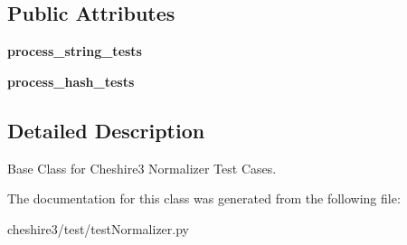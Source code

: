 \subsection*{Public Attributes}
\begin{DoxyCompactItemize}
\item 
\hypertarget{classcheshire3_1_1test_1_1test_normalizer_1_1_normalizer_test_case_a9326f944ed7fbf3181d10ad4c1018790}{{\bfseries process\-\_\-string\-\_\-tests}}\label{classcheshire3_1_1test_1_1test_normalizer_1_1_normalizer_test_case_a9326f944ed7fbf3181d10ad4c1018790}

\item 
\hypertarget{classcheshire3_1_1test_1_1test_normalizer_1_1_normalizer_test_case_afa13483bfef04491b99af55f94afad50}{{\bfseries process\-\_\-hash\-\_\-tests}}\label{classcheshire3_1_1test_1_1test_normalizer_1_1_normalizer_test_case_afa13483bfef04491b99af55f94afad50}

\end{DoxyCompactItemize}


\subsection{Detailed Description}
\begin{DoxyVerb}Base Class for Cheshire3 Normalizer Test Cases.\end{DoxyVerb}
 

The documentation for this class was generated from the following file\-:\begin{DoxyCompactItemize}
\item 
cheshire3/test/test\-Normalizer.\-py\end{DoxyCompactItemize}
